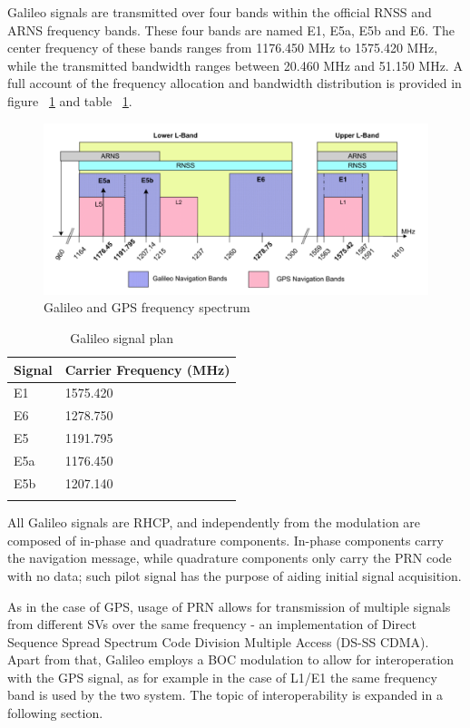 \vspace{\baselineskip}

Galileo signals are transmitted over four bands within the official RNSS and
ARNS frequency bands. These four bands are named E1, E5a, E5b and E6. The center
frequency of these bands ranges from \num{1176.450} \si{MHz} to \num{1575.420}
\si{MHz}, while the transmitted bandwidth ranges between \num{20.460} \si{MHz}
and \num{51.150} \si{MHz}. A full account of the frequency allocation and
bandwidth distribution is provided in figure ~\ref{fig:galileo_frequencies} and
table ~\ref{table:galileo_signals}.


\begin{figure}[h!]
  \includegraphics[width=\linewidth]{figures/galileo_signal_plan.png}
  \caption{Galileo and GPS frequency spectrum}
  \label{fig:galileo_frequencies}
\end{figure}

\begin{longtable}[]{@{}ll@{}}
  \toprule
  Signal & Carrier Frequency (MHz)\tabularnewline
  \midrule
  \endhead
  E1 & 1575.420\tabularnewline
  E6 & 1278.750\tabularnewline
  E5 & 1191.795\tabularnewline
  E5a & 1176.450\tabularnewline
  E5b & 1207.140\tabularnewline
  \bottomrule
  \caption{Galileo signal plan}
  \label{table:galileo_signals}
\end{longtable}

All Galileo signals are RHCP, and independently from the modulation are composed
of in-phase and quadrature components. In-phase components carry the navigation
message, while quadrature components only carry the PRN code with no data; such
pilot signal has the purpose of aiding initial signal acquisition.

As in the case of GPS, usage of PRN allows for transmission of multiple signals
from different SVs over the same frequency - an implementation of Direct
Sequence Spread Spectrum Code Division Multiple Access (DS-SS CDMA). Apart from
that, Galileo employs a BOC modulation to allow for interoperation with the GPS
signal, as for example in the case of L1/E1 the same frequency band is used by
the two system. The topic of interoperability is expanded in a following
section.

